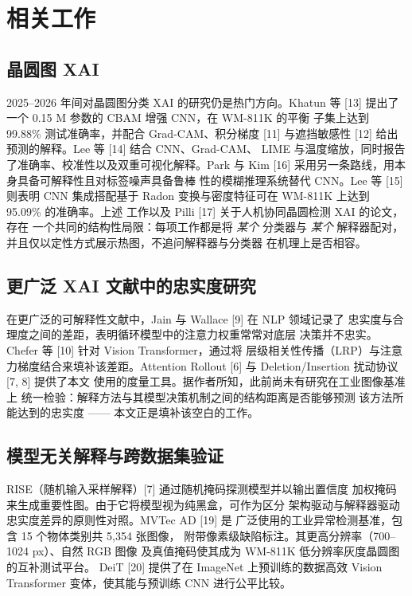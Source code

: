 \documentclass[11pt,a4paper]{article}
\begin{document}
\section{相关工作}

\subsection{晶圆图 XAI}

2025–2026 年间对晶圆图分类 XAI 的研究仍是热门方向。Khatun 等 [13] 提出了一个 0.15 M 参数的 CBAM 增强 CNN，在 WM-811K 的平衡 子集上达到 99.88\% 测试准确率，并配合 Grad-CAM、积分梯度 [11] 与遮挡敏感性 [12] 给出预测的解释。Lee 等 [14] 结合 CNN、Grad-CAM、 LIME 与温度缩放，同时报告了准确率、校准性以及双重可视化解释。Park 与 Kim [16] 采用另一条路线，用本身具备可解释性且对标签噪声具备鲁棒 性的模糊推理系统替代 CNN。Lee 等 [15] 则表明 CNN 集成搭配基于 Radon 变换与密度特征可在 WM-811K 上达到 95.09\% 的准确率。上述 工作以及 Pilli [17] 关于人机协同晶圆检测 XAI 的论文，存在 一个共同的结构性局限：每项工作都是将 \emph{某个} 分类器与 \emph{某个} 解释器配对，并且仅以定性方式展示热图，不追问解释器与分类器 在机理上是否相容。

\subsection{更广泛 XAI 文献中的忠实度研究}

在更广泛的可解释性文献中，Jain 与 Wallace [9] 在 NLP 领域记录了 忠实度与合理度之间的差距，表明循环模型中的注意力权重常常对底层 决策并不忠实。Chefer 等 [10] 针对 Vision Transformer，通过将 层级相关性传播（LRP）与注意力梯度结合来填补该差距。Attention Rollout [6] 与 Deletion/Insertion 扰动协议 [7, 8] 提供了本文 使用的度量工具。据作者所知，此前尚未有研究在工业图像基准上 统一检验：解释方法与其模型决策机制之间的结构距离是否能够预测 该方法所能达到的忠实度 —— 本文正是填补该空白的工作。

\subsection{模型无关解释与跨数据集验证}

RISE（随机输入采样解释）[7] 通过随机掩码探测模型并以输出置信度 加权掩码来生成重要性图。由于它将模型视为纯黑盒，可作为区分 架构驱动与解释器驱动忠实度差异的原则性对照。MVTec AD [19] 是 广泛使用的工业异常检测基准，包含 15 个物体类别共 5,354 张图像， 附带像素级缺陷标注。其更高分辨率（700–1024 px）、自然 RGB 图像 及真值掩码使其成为 WM-811K 低分辨率灰度晶圆图的互补测试平台。 DeiT [20] 提供了在 ImageNet 上预训练的数据高效 Vision Transformer 变体，使其能与预训练 CNN 进行公平比较。
\end{document}
